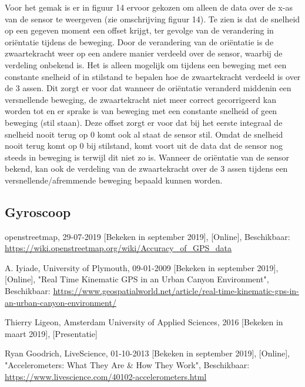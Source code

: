 \documentclass[a4paper, 11pt]{article} %
\begin{document}
Voor het gemak is er in figuur 14 ervoor gekozen om alleen de data over de x-as van de sensor te weergeven (zie omschrijving figuur 14). Te zien is dat de snelheid op een gegeven moment een offset krijgt, ter gevolge van de verandering in oriëntatie tijdens de beweging. Door de verandering van de oriëntatie is de zwaartekracht weer op een andere manier verdeeld over de sensor, waarbij de verdeling onbekend is. Het is alleen mogelijk om tijdens een beweging met een constante snelheid of in stilstand te bepalen hoe de zwaartekracht verdeeld is over de 3 assen. Dit zorgt er voor dat wanneer de oriëntatie veranderd middenin een versnellende beweging, de zwaartekracht niet meer correct gecorrigeerd kan worden tot en er sprake is van beweging met een constante snelheid of geen beweging (stil staan). Deze offset zorgt er voor dat bij het eerste integraal de snelheid nooit terug op 0 komt ook al staat de sensor stil. Omdat de snelheid nooit terug komt op 0 bij stilstand, komt voort uit de data dat de sensor nog steeds in beweging is terwijl dit niet zo is. Wanneer de oriëntatie van de sensor bekend, kan ook de verdeling van de zwaartekracht over de 3 assen tijdens een versnellende/afremmende beweging bepaald kunnen worden.
\newpage
\subsection{Gyroscoop}
\newpage
\begin{thebibliography}{9}
	openstreetmap,
	29-07-2019 [Bekeken in september 2019],
	[Online],
	Beschikbaar: \url{https://wiki.openstreetmap.org/wiki/Accuracy_of_GPS_data}

	A. Iyiade,
	University of Plymouth,
	09-01-2009 [Bekeken in september 2019],
	[Online],
	"Real Time Kinematic GPS in an Urban Canyon Environment",
	Beschikbaar: \url{https://www.geospatialworld.net/article/real-time-kinematic-gps-in-an-urban-canyon-environment/}

	Thierry Ligeon,
	Amsterdam University of Applied Sciences,
	2016 [Bekeken in maart 2019],
	[Presentatie]
	
	Ryan Goodrich,
	LiveScience,
	01-10-2013 [Bekeken in september 2019],
	[Online],
	"Accelerometers: What They Are \& How They Work",
	Beschikbaar: \url{https://www.livescience.com/40102-accelerometers.html}
\end{thebibliography}
\end{document}
